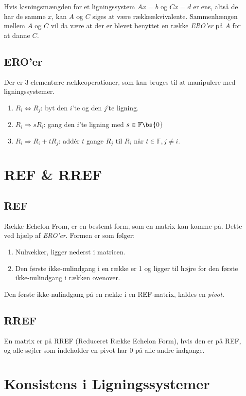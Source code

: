 Hvis løsningsmængden for et ligningssystem $Ax = b$ og $Cx = d$ er ens, altså
de har de samme $x$, kan $A$ og $C$ siges at være rækkeækvivalente.
Sammenhængen mellem $A$ og $C$ vil da være at der er blevet benyttet en række
\textit{ERO'er} på $A$ for at danne $C$.

\subsection{ERO'er}
Der er 3 elementære rækkeoperationer, som kan bruges til at manipulere med
ligningssystemer.

\begin{enumerate}
	\item $R_i \Leftrightarrow R_j$: byt den $i$'te og den $j$'te ligning.
	\item $R_i \Rightarrow sR_i$: gang den $i$'te ligning med $s \in 
		\mathbb{F} \bs \{0\}$
	\item $R_i \Rightarrow R_i+tR_j$: addér $t$ gange $R_j$ til $R_i$ når $t 
		\in \mathbb{F}, j \not= i$.
\end{enumerate}


\section{REF \& RREF}
\subsection{REF}
Række Echelon From, er en bestemt form, som en matrix kan komme på. Dette ved 
hjælp af \textit{ERO'er}. Formen er som følger:

\begin{enumerate}
	\item Nulrækker, ligger nederst i matricen.
	\item Den første ikke-nulindgang i en række er 1 og ligger til højre for
		den første ikke-nulindgang i rækken ovenover.
\end{enumerate}
Den første ikke-nulindgang på en række i en REF-matrix, kaldes en 
\textit{pivot}.

\subsection{RREF}
En matrix er på RREF (Reduceret Række Echelon Form), hvis den er på REF, og 
alle søjler som indeholder en pivot har 0 på alle andre indgange.

\section{Konsistens i Ligningssystemer}



